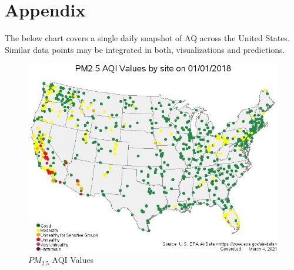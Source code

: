 \documentclass[sigconf,nonacm,11pt]{acmart}
\begin{document}
\appendix
\section{Appendix}
The below chart covers a single daily snapshot of AQ across the United States. Similar data points may be integrated in both, visualizations and predictions.

\begin{figure}[!th]
    \centering
    \includegraphics[scale=0.4]{images/AQ_US_2018.jpg}
    \caption{$PM_{2.5 }$ AQI Values}
\end{figure}



\end{document}
